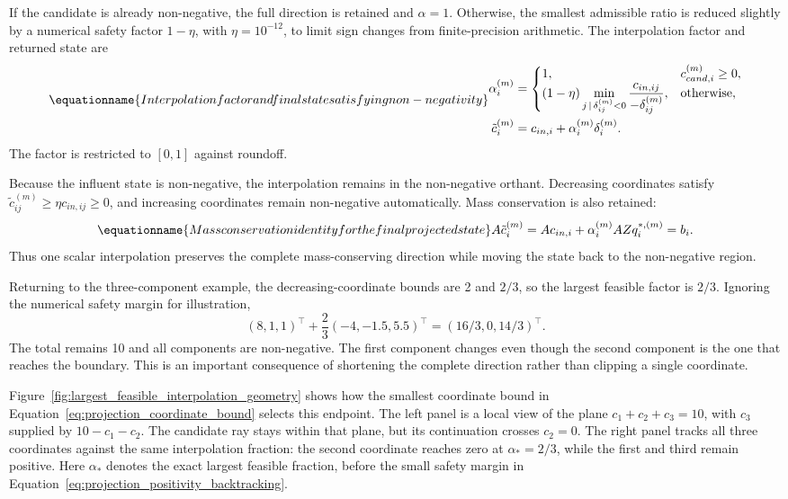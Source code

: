 If the candidate is already non-negative, the full direction is retained and $\alpha=1$. Otherwise, the smallest admissible ratio is reduced slightly by a numerical safety factor $1-\eta$, with $\eta=10^{-12}$, to limit sign changes from finite-precision arithmetic. The interpolation factor and returned state are
\begin{equation}
\equationname{Interpolation factor and final state satisfying non-negativity}
\begin{split}
\alpha_i^{(m)}&=
\begin{cases}
1, & c_{cand,i}^{(m)}\geq0,\\
(1-\eta)\displaystyle\min_{j\,\mid\,\delta_{ij}^{(m)}<0}
\frac{c_{in,ij}}{-\delta_{ij}^{(m)}}, & \text{otherwise},
\end{cases}\\
\tilde c_i^{(m)}&=c_{in,i}+\alpha_i^{(m)}\delta_i^{(m)}.
\end{split}
\label{eq:projection_positivity_backtracking}
\end{equation}
The factor is restricted to $[0,1]$ against roundoff.

Because the influent state is non-negative, the interpolation remains in the non-negative orthant. Decreasing coordinates satisfy
$\tilde c_{ij}^{(m)}\geq\eta c_{in,ij}\geq0$,
and increasing coordinates remain non-negative automatically. Mass conservation is also retained:
\begin{equation}
\equationname{Mass conservation identity for the final projected state}
A\tilde c_i^{(m)}=Ac_{in,i}+\alpha_i^{(m)}AZq_i^{*,(m)}=b_i.
\label{eq:projection_final_conservation}
\end{equation}
Thus one scalar interpolation preserves the complete mass-conserving direction while moving the state back to the non-negative region.

Returning to the three-component example, the decreasing-coordinate bounds are 2 and $2/3$, so the largest feasible factor is $2/3$. Ignoring the numerical safety margin for illustration,
\[
(8,1,1)^\top+\frac23(-4,-1.5,5.5)^\top
=
(16/3,0,14/3)^\top.
\]
The total remains 10 and all components are non-negative. The first component changes even though the second component is the one that reaches the boundary. This is an important consequence of shortening the complete direction rather than clipping a single coordinate.

Figure~\ref{fig:largest_feasible_interpolation_geometry} shows how the smallest coordinate bound in Equation~\eqref{eq:projection_coordinate_bound} selects this endpoint. The left panel is a local view of the plane $c_1+c_2+c_3=10$, with $c_3$ supplied by $10-c_1-c_2$. The candidate ray stays within that plane, but its continuation crosses $c_2=0$. The right panel tracks all three coordinates against the same interpolation fraction: the second coordinate reaches zero at $\alpha_*=2/3$, while the first and third remain positive. Here $\alpha_*$ denotes the exact largest feasible fraction, before the small safety margin in Equation~\eqref{eq:projection_positivity_backtracking}.

